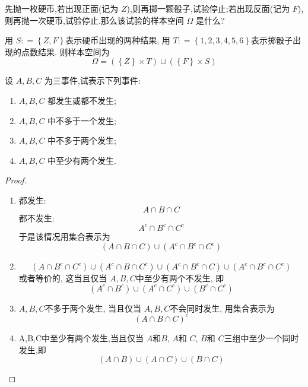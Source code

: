 \documentclass[../main.tex]{subfiles}
\begin{document}
\begin{exercise}{}{}
先抛一枚硬币,若出现正面(记为 $Z$),则再掷一颗骰子,试验停止;若出现反面(记为 $F$),则再抛一次硬币,试验停止.那么该试验的样本空间 $\Omega$ 是什么?
\end{exercise}
\begin{solution}
    用 \(  S: = \left\{ Z,F \right\}  \)表示硬币出现的两种结果, 用 \(  T: = \left\{ 1,2,3,4,5,6 \right\}  \)表示掷骰子出现的点数结果. 则样本空间为 \[
     \Omega = \left( \left\{ Z \right\}\times T \right)\sqcup \left( \left\{ F \right\}\times S  \right) 
    \]  
\end{solution}

\begin{exercise}{}{}
设 $A,B,C$ 为三事件,试表示下列事件:
\begin{enumerate}
    \item $A,B,C$ 都发生或都不发生;
    \item $A,B,C$ 中不多于一个发生;
    \item $A,B,C$ 中不多于两个发生;
    \item $A,B,C$ 中至少有两个发生.
\end{enumerate}
\end{exercise}
\begin{proof}
    \begin{enumerate}
        \item 都发生: \[
        A\cap B\cap C
        \]都不发生: \[
        A^{c}\cap B^{c}\cap C^{c}
        \]于是该情况用集合表示为 \[
        \left( A\cap B\cap C \right)\cup \left( A^{c}\cap B^{c}\cap C^{c} \right)  
        \]
        \item  \[
        \left( A\cap B^{c}\cap C^{c} \right)\cup \left( A^{c}\cap B\cap C^{c} \right)\cup \left( A^{c}\cap B^{c}\cap C \right)   \cup \left( A^{c}\cap B^{c}\cap C^{c} \right) 
        \] 或者等价的, 这当且仅当 \(  A,B,C  \)中至少有两个不发生, 即 \[
        \left( A^{c}\cap B^{c} \right)\cup \left( A^{c}\cap C^{c} \right)\cup \left( B^{c}\cap C^{c} \right)   
        \] 
        \item \(  A,B,C  \)不多于两个发生, 当且仅当 \(  A,B,C  \)不会同时发生, 用集合表示为  \[
        \left( A\cap B\cap C \right)^{c} 
        \]
        \item A,B,C中至少有两个发生,当且仅当 \(  A  \)和\(  B  \), \(  A  \)和 \(  C  \), \(  B  \)和 \(  C  \)三组中至少一个同时发生,即 \[
        \left( A\cap B \right)\cup \left( A\cap C \right)\cup \left( B\cap C \right)   
        \]      
    \end{enumerate}
    
\end{proof}
\end{document}
